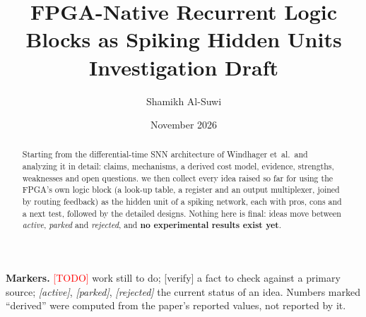 \documentclass[11pt,a4paper]{article}
\title{FPGA-Native Recurrent Logic Blocks as Spiking Hidden Units\\[0.4em]\large Investigation Draft}
\author{Shamikh Al-Suwi}
\date{November 2026}
\begin{document}
\maketitle

\begin{abstract}
 Starting from the differential-time SNN architecture of Windhager et~al.\ and analyzing it in detail: claims, mechanisms, a derived cost model, evidence, strengths, weaknesses and open questions. we then collect every idea raised so far for using the FPGA's own logic block (a look-up table, a register and an output multiplexer, joined by routing feedback) as the hidden unit of a spiking network, each with pros, cons and a next test, followed by the detailed designs. Nothing here is final: ideas move between \emph{active}, \emph{parked} and \emph{rejected}, and \textbf{no experimental results exist yet}.
\end{abstract}

\tableofcontents

\medskip\noindent\textbf{Markers.} \textcolor{red}{[TODO]} work still to do; \textcolor{orange!80!black}{[verify]} a fact to check against a primary source; \textit{[active]}, \textit{[parked]}, \textit{[rejected]} the current status of an idea. Numbers marked ``derived'' were computed from the paper's reported values, not reported by it.
\newpage














\appendix




\end{document}
